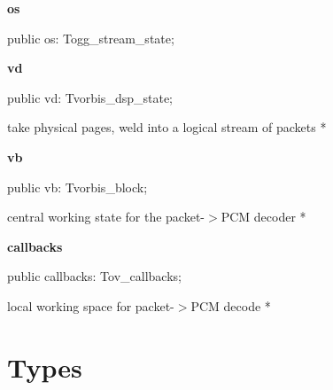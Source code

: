 \documentclass{report}
\newif\ifpdf
\begin{document}
\begin{list}{}
\begin{flushleft}
\ifpdf
\end{flushleft}
\fi


\par  \label{ok_vorbisfile.TOggVorbis_File-os}
\item[\textbf{os}\hfill]
\ifpdf
\begin{flushleft}
\fi
\begin{ttfamily}
public os: Togg{\_}stream{\_}state;\end{ttfamily}

\ifpdf
\end{flushleft}
\fi


\par  \label{ok_vorbisfile.TOggVorbis_File-vd}
\item[\textbf{vd}\hfill]
\ifpdf
\begin{flushleft}
\fi
\begin{ttfamily}
public vd: Tvorbis{\_}dsp{\_}state;\end{ttfamily}

\ifpdf
\end{flushleft}
\fi


\par * take physical pages, weld into a logical stream of packets *\label{ok_vorbisfile.TOggVorbis_File-vb}
\item[\textbf{vb}\hfill]
\ifpdf
\begin{flushleft}
\fi
\begin{ttfamily}
public vb: Tvorbis{\_}block;\end{ttfamily}

\ifpdf
\end{flushleft}
\fi


\par * central working state for the packet{-}{$>$}PCM decoder *\label{ok_vorbisfile.TOggVorbis_File-callbacks}
\item[\textbf{callbacks}\hfill]
\ifpdf
\begin{flushleft}
\fi
\begin{ttfamily}
public callbacks: Tov{\_}callbacks;\end{ttfamily}

\ifpdf
\end{flushleft}
\fi


\par * local working space for packet{-}{$>$}PCM decode *\end{list}
\section{Types}
\ifpdf
\end{document}
